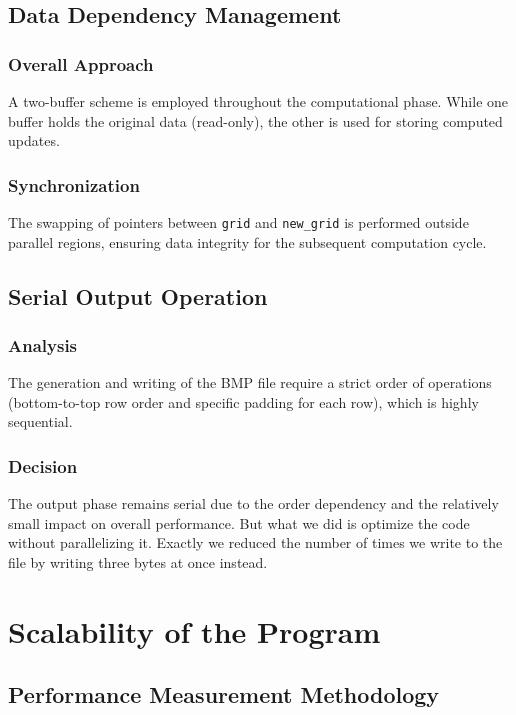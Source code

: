 \documentclass[12pt]{article}
\begin{document}
\newpage
\subsection{Data Dependency Management}

\subsubsection{Overall Approach}
A two-buffer scheme is employed throughout the computational phase. While one buffer holds the original data (read-only), the other is used for storing computed updates.

\subsubsection{Synchronization}
The swapping of pointers between \texttt{grid} and \texttt{new\_grid} is performed outside parallel regions, ensuring data integrity for the subsequent computation cycle.

\subsection{Serial Output Operation}

\subsubsection{Analysis}
The generation and writing of the BMP file require a strict order of operations (bottom-to-top row order and specific padding for each row), which is highly sequential.

\subsubsection{Decision}
The output phase remains serial due to the order dependency and the relatively small impact on overall performance. But what we did is optimize the code without parallelizing it.
Exactly we reduced the number of times we write to the file by writing three bytes at once instead.

\newpage
\section{Scalability of the Program}

\subsection{Performance Measurement Methodology}
\end{document}
